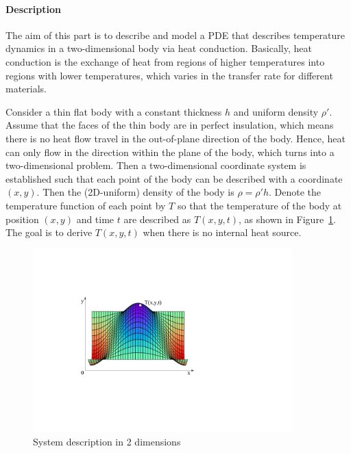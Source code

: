

\paragraph{Description}
The aim of this part is to describe and model a PDE that describes temperature dynamics in a two-dimensional body via heat conduction.
Basically, heat conduction is the exchange of heat from regions of higher temperatures into regions with lower temperatures, which varies in the transfer rate for different materials.

Consider a thin flat body with a constant thickness $h$ and uniform density $\rho'$. Assume that the faces of the thin body are in perfect insulation, which means there is no heat flow travel in the out-of-plane direction of the body. Hence, heat can only flow in the direction within the plane of the body, which turns into a two-dimensional problem. Then a two-dimensional coordinate system is established such that each point of the body can be described with a coordinate $(x,y)$. Then the (2D-uniform) density of the body is $\rho = \rho' h$. Denote the temperature function of each point by $T$ so that the temperature of the body at position $(x,y)$ and time $t$ are described as $T(x,y,t)$, as shown in Figure~\ref{heatSystem.fig}. The goal is to derive $T(x,y,t)$ when there is no internal heat source.

\begin{figure}[htb]
	\centering
	\includegraphics[width=10cm]{heatSystem.pdf}       
	\caption{System description in 2 dimensions}\label{heatSystem.fig}
\end{figure}

